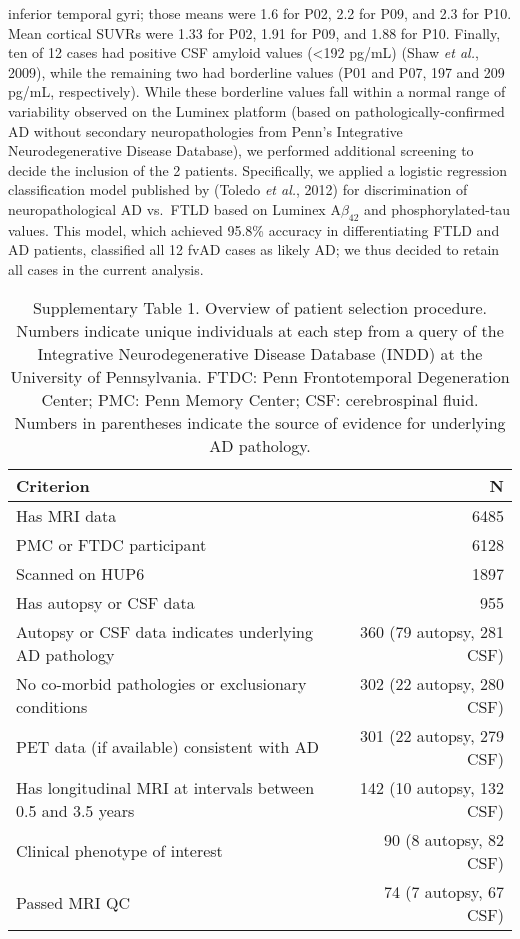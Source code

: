 \documentclass[]{article}
\begin{document}
inferior temporal gyri; those means were 1.6 for P02, 2.2 for P09, and
2.3 for P10. Mean cortical SUVRs were 1.33 for P02, 1.91 for P09, and
1.88 for P10. Finally, ten of 12 cases had positive CSF amyloid values
(\textless{}192 pg/mL) (Shaw \emph{et al.}, 2009), while the remaining
two had borderline values (P01 and P07, 197 and 209 pg/mL,
respectively). While these borderline values fall within a normal range
of variability observed on the Luminex platform (based on
pathologically-confirmed AD without secondary neuropathologies from
Penn's Integrative Neurodegenerative Disease Database), we performed
additional screening to decide the inclusion of the 2 patients.
Specifically, we applied a logistic regression classification model
published by (Toledo \emph{et al.}, 2012) for discrimination of
neuropathological AD vs.~FTLD based on Luminex A\(\beta_{42}\) and
phosphorylated-tau values. This model, which achieved 95.8\% accuracy in
differentiating FTLD and AD patients, classified all 12 fvAD cases as
likely AD; we thus decided to retain all cases in the current analysis.

\begin{table}[ht]
\centering
\caption{Supplementary Table 1. Overview of patient selection procedure. Numbers indicate unique individuals at each step from a query of the Integrative Neurodegenerative Disease Database (INDD) at the University of Pennsylvania. FTDC: Penn Frontotemporal Degeneration Center; PMC: Penn Memory Center; CSF: cerebrospinal fluid. Numbers in parentheses indicate the source of evidence for underlying AD pathology.} 
\begin{tabular}{lr}
  \hline
Criterion & N \\ 
  \hline
Has MRI data & 6485 \\ 
  PMC or FTDC participant & 6128 \\ 
  Scanned on HUP6 & 1897 \\ 
  Has autopsy or CSF data & 955 \\ 
  Autopsy or CSF data indicates underlying AD pathology & 360 (79 autopsy, 281 CSF) \\ 
  No co-morbid pathologies or exclusionary conditions & 302 (22 autopsy, 280 CSF) \\ 
  PET data (if available) consistent with AD & 301 (22 autopsy, 279 CSF) \\ 
  Has longitudinal MRI at intervals between 0.5 and 3.5 years & 142 (10 autopsy, 132 CSF) \\ 
  Clinical phenotype of interest & 90 (8 autopsy, 82 CSF) \\ 
  Passed MRI QC & 74 (7 autopsy, 67 CSF) \\ 
   \hline
\end{tabular}
\end{table}
\end{document}

